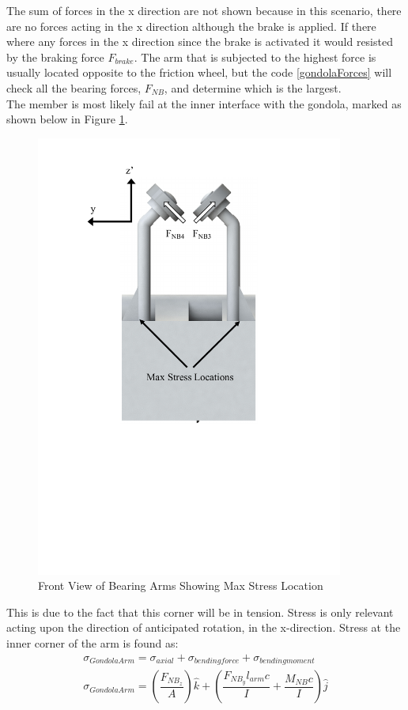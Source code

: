 \documentclass[../main.tex]{subfiles}
\begin{document}
The sum of forces in the x direction are not shown because in this scenario, there are no forces acting in the x direction although the brake is applied. If there where any forces in the x direction since the brake is activated it would resisted by the braking force $F_{brake}$. The arm that is subjected to the highest force is usually located opposite to the friction wheel, but the code \ref{gondolaForces} will check all the bearing forces, $F_{NB}$, and determine which is the largest. \\

The member is most likely fail at the inner interface with the gondola, marked as shown below in Figure \ref{fig:armStressLocation}.
\begin{figure}[H]
	\centering
	\includegraphics[width=0.9\textwidth]{img/gondola/BearingArmStressLocation.pdf}
	\caption{Front View of Bearing Arms Showing Max Stress Location}
	\label{fig:armStressLocation}
\end{figure}
This is due to the fact that this corner will be in tension. Stress is only relevant acting upon the direction of anticipated rotation, in the x-direction. Stress at the inner corner of the arm is found as:
\begin{align}
	\sigma _{Gondola Arm} = \sigma _{axial} + \sigma _{bending force} + \sigma _{bending moment} \\ \label{armStress}
	\sigma _{Gondola Arm}  = \left(\dfrac{F_{NB_{z}}}{A}\right)\hat{k} + \left(\dfrac{F_{NB_{y}}l_{arm}c}{I}  + \dfrac{M_{NB}c}{I} \right) \hat{j}
\end{align}
\end{document}
